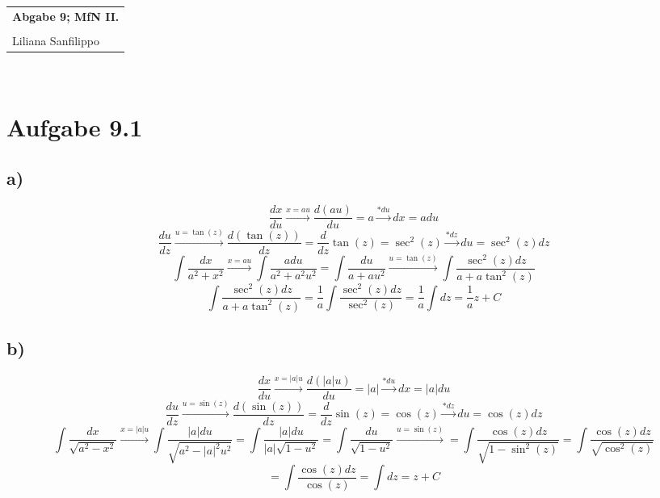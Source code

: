 \documentclass{article} %
\newcommand{\titulo}{Abgabe 9; MfN II.}
\newcommand{\nombre}{Liliana Sanfilippo}
\begin{document}
\begin{tabular}{p{12cm}}
{{\Large\bf\titulo}}\\
\vspace{0.2cm}\\
 {\large\nombre}\\
\end{tabular}
\vspace{0.2cm}\\
\section{Aufgabe 9.1}
\subsection{a)} 
\[
\frac{dx}{du} \overset{x = au}{\rightarrow} \frac{d(au)}{du} = a \overset{* du}{\rightarrow} dx = a du 
\]
\[
\frac{du}{dz} \overset{u = \tan(z)}{\rightarrow} \frac{d(\tan(z))}{dz} = \frac{d}{dz} \tan(z) = \sec^2 (z) \overset{* dz}{\rightarrow} du  = \sec^2 (z) dz
\]
\[
\int \frac{dx}{a^2+x^2} \overset{x = au}{\rightarrow} \int \frac{a du}{a^2+a^2u^2} = \int \frac{du}{a+a u^2} \overset{u = \tan(z)}{\rightarrow} \int \frac{\sec^2 (z) dz}{a+a \tan^2(z)} 
\]
\[
\int \frac{\sec^2 (z) dz}{a+a \tan^2(z)}  = \frac{1}{a} \int \frac{\sec^2 (z) dz}{\sec^2 (z)}   = \frac{1}{a} \int dz = \frac{1}{a} z + C
\]
\subsection{b)} 
\[
\frac{dx}{du} \overset{x = |a|u}{\rightarrow} 
\frac{d(|a|u)}{du} = |a| \overset{* du}{\rightarrow} dx = |a| du
\]
\[
\frac{du}{dz} \overset{u = \sin(z)}{\rightarrow} 
\frac{d(\sin(z))}{dz}
= \frac{d}{dz} \sin(z) = \cos(z) \overset{* dz}{\rightarrow} du = \cos(z) dz 
\]
\[
\int \frac{dx}{\sqrt{a^2 - x^2}}
\overset{x = |a|u}{\rightarrow} \int \frac{|a| du}{\sqrt{a^2 - |a|^2u^2}}
= \int \frac{|a| du}{|a| \sqrt{1-u^2}}
= \int \frac{du}{\sqrt{1-u^2}} \overset{u = \sin(z)}{\rightarrow}
= \int \frac{\cos(z) dz }{\sqrt{1-\sin^2(z)}} 
= \int \frac{\cos(z) dz }{\sqrt{\cos^2(z)}}
\]
\[
= \int \frac{\cos(z) dz }{\cos(z)} = \int dz = z + C
\]
\end{document}

